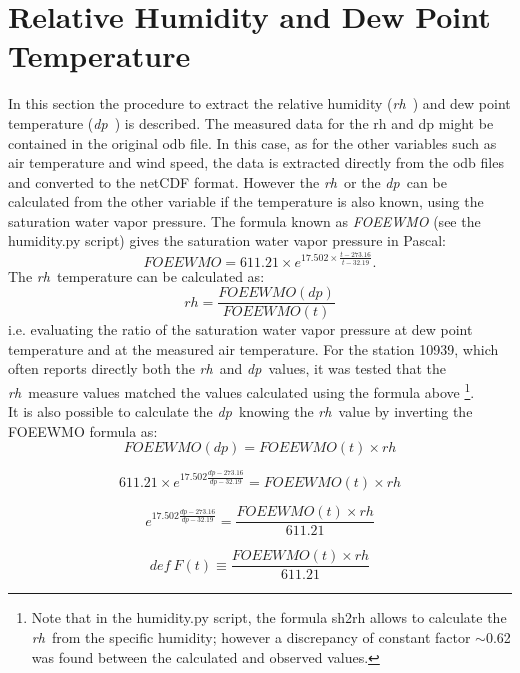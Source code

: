 \documentclass[a4paper,11pt]{article}
\newcommand{\dp}{\textit{dp~}}
\newcommand{\rh}{\textit{rh~}}
\begin{document}
\section{Relative Humidity and Dew Point Temperature}
In this section the procedure to extract the relative humidity (\rh) and dew point temperature (\dp) is described.
The measured data for the rh and dp might be contained in the original odb file. In this case, as for the other variables such as air temperature and wind speed, the data is extracted directly from the odb files and converted to the netCDF format.
However the \rh or the \dp can be calculated from the other variable if the temperature is also known, using the saturation water vapor pressure. The formula known as \textit{FOEEWMO} (see the humidity.py script) gives the saturation water vapor pressure in Pascal:
\begin{equation}
FOEEWMO = 611.21 \times e^{17.502 \times \frac{t - 273.16}{t -32.19} } .
\end{equation}
The \rh temperature can be calculated as:
\begin{equation}
rh = \frac{FOEEWMO(dp)}{FOEEWMO(t)}
\end{equation}
i.e. evaluating the ratio of the saturation water vapor pressure at dew point temperature and at the measured air temperature. For the station 10939, which often reports directly both the \rh and \dp values, it was tested that the \rh measure values matched the values calculated using the formula above \footnote{Note that in the humidity.py script, the formula sh2rh allows to calculate the \rh from the specific humidity; however a discrepancy of constant factor $\sim$0.62 was found between the calculated and observed values.}.
\\
It is also possible to calculate the \dp knowing the \rh value by inverting the FOEEWMO formula as:
\begin{equation}
FOEEWMO(dp) = FOEEWMO(t) \times rh 
\end{equation}

\begin{equation*}
611.21 \times e^{17.502 \frac{dp - 273.16}{dp-32.19}} = FOEEWMO(t) \times rh
\end{equation*}

\begin{equation*}
 e^{17.502 \frac{dp - 273.16}{dp-32.19}} =  \frac{FOEEWMO(t) \times rh}{611.21}
\end{equation*}


\begin{equation*}
def \ F(t) \equiv \frac{FOEEWMO(t) \times rh}{611.21}
\end{equation*}
\end{document}
